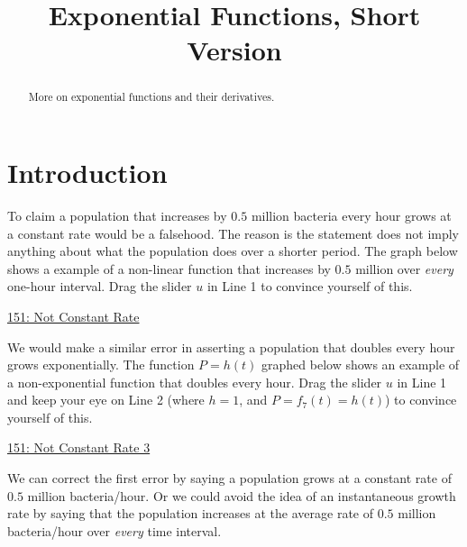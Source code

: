 \documentclass{ximera}
\title{Exponential Functions, Short Version}
\begin{document}
\begin{abstract}
More on exponential functions and their derivatives. 
\end{abstract}
\maketitle



\section{Introduction}

To claim a population that increases by $0.5$ million bacteria every hour grows at a constant rate would be a falsehood. The reason is the statement does not imply anything about what the population does over a shorter period. The graph below shows a example of a non-linear function that increases by $0.5$ million over \emph{every} one-hour interval. Drag the slider $u$ in Line 1 to convince yourself of this.

\href{https://www.desmos.com/calculator/ehtzdzckmy}{151: Not Constant Rate}

 
\begin{onlineOnly}
    \begin{center}
\end{center}
\end{onlineOnly}

We would make a similar error in asserting a population that doubles every hour grows exponentially.  The function $P=h(t)$ graphed below shows an example of a non-exponential function that doubles every hour. Drag the slider $u$ in Line 1 and keep your eye on Line 2 (where $h=1$, and $P=f_7(t) = h(t)$) to convince yourself of this.

\href{https://www.desmos.com/calculator/zapwlt6qju}{151: Not Constant Rate 3} 
 
\begin{onlineOnly}
    \begin{center}
\end{center}
\end{onlineOnly}

We can correct the first error by saying a population grows at a constant rate of $0.5$ million bacteria/hour. Or we could  avoid the idea of an instantaneous growth rate by saying that the population increases at the average rate of $0.5$ million bacteria/hour over \emph{every} time interval.
\end{document}
